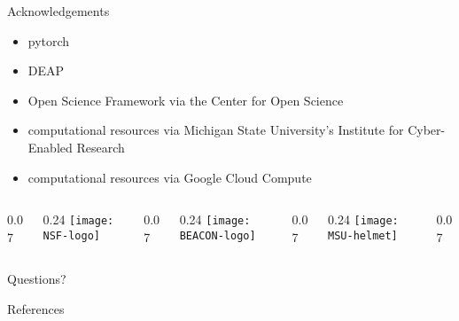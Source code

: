 \begin{frame}{Acknowledgements}
\begin{itemize}
\item pytorch
\item DEAP
\item Open Science Framework via the Center for Open Science
\item computational resources via Michigan State University's Institute for Cyber-Enabled Research
\item computational resources via Google Cloud Compute
\end{itemize}

\newcommand{\innerspacer}{0.07\textwidth}
\newcommand{\content}{0.24\textwidth}
\newcommand{\outerspacer}{0.07\textwidth}

\begin{center}
 \begin{columns}
	\begin{column}{\outerspacer}~\end{column}
	 \begin{column}{\content}
		\texttt{[image: NSF-logo]}
 	\end{column}
  \begin{column}{\innerspacer}~\end{column}
	 \begin{column}{\content}
		\texttt{[image: BEACON-logo]}
 	\end{column}
  \begin{column}{\innerspacer}~\end{column}
 	\begin{column}{\content}
   \texttt{[image: MSU-helmet]}
 	\end{column}
 	\begin{column}{\outerspacer}~\end{column}
 \end{columns}
\end{center}

\end{frame}


\begin{frame}[standout]
  Questions?
\end{frame}

\begin{frame}[allowframebreaks]{References}

  
  \nocite{*} %
  
\end{frame}
